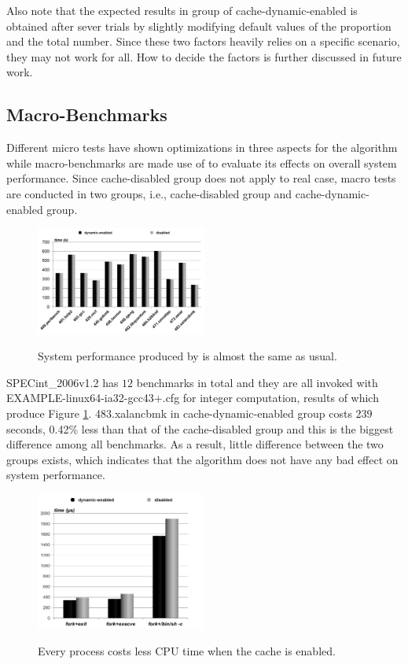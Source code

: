 Also note that the expected results in group of cache-dynamic-enabled is obtained after sever trials by slightly modifying default values of the proportion and the total number. Since these two factors heavily relies on a specific scenario, they may not work for all. How to decide the factors is further discussed in future work.

\subsection{Macro-Benchmarks}

Different micro tests have shown optimizations in three aspects for the algorithm while macro-benchmarks are made use of to evaluate its effects on overall system performance. Since cache-disabled group does not apply to real case, macro tests are conducted in two groups, i.e., cache-disabled group and cache-dynamic-enabled group.

\begin{figure}[htp]
\centering
\includegraphics[width=0.5\textwidth]{image/macro/spec.png} \\
\caption{System performance produced by \name is almost the same as usual.}
\label{fig:spec}
\end{figure}

SPECint\_2006v1.2 has $12$ benchmarks in total and they are all invoked with EXAMPLE-linux64-ia32-gcc43+.cfg for integer computation, results of which produce Figure \ref{fig:spec}. 483.xalancbmk in cache-dynamic-enabled group costs $239$ seconds, 0.42\% less
than that of the cache-disabled group and this is the biggest difference among all benchmarks. As a result, little difference between the two groups exists, which indicates that the algorithm does not have any bad effect on system performance.

\begin{figure}[htp]
\centering
\includegraphics[width=0.5\textwidth]{image/macro/lmbench.png} \\
\caption{Every process costs less CPU time when the cache is enabled.}
\label{fig:lmbench}
\end{figure}

